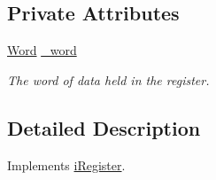 \subsection*{Private Attributes}
\begin{DoxyCompactItemize}
\item 
\hypertarget{classRegister_ad716faf568aba3da6e4acca6674f9ec9}{
\hyperlink{classWord}{Word} \hyperlink{classRegister_ad716faf568aba3da6e4acca6674f9ec9}{\_\-word}}
\label{classRegister_ad716faf568aba3da6e4acca6674f9ec9}

\begin{DoxyCompactList}\small\item\em The word of data held in the register. \item\end{DoxyCompactList}\end{DoxyCompactItemize}


\subsection{Detailed Description}
Implements \hyperlink{classiRegister}{iRegister}. 